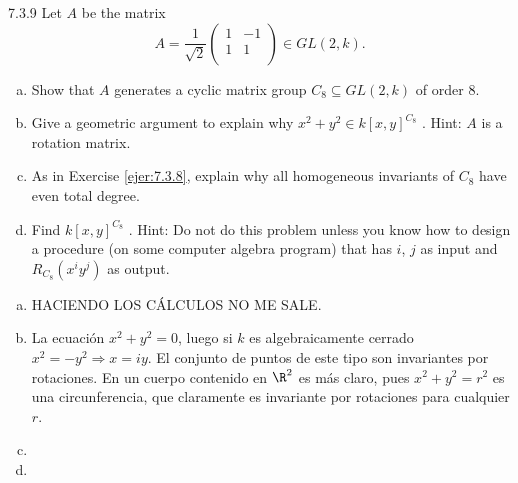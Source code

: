 \documentclass[twoside]{article}
\begin{document}
\begin{ejercicio}{7.3.9}
Let $A$ be the matrix
\[
A =
\frac{1}{\sqrt{2}}\begin{pmatrix}
1 &−1\\
1 &1\\
\end{pmatrix}
∈ GL(2, k).
\]
\begin{enumerate}[a.]
\item Show that $A$ generates a cyclic matrix group $C_8 ⊆ GL(2, k)$ of order 8.
\item Give a geometric argument to explain why $x^2 + y^2 ∈ k[x, y]^{C_8}$ . Hint: $A$ is a rotation
matrix.
\item As in Exercise \ref{ejer:7.3.8}, explain why all homogeneous invariants of $C_8$ have even total
degree.
\item Find $k[x, y]^{C_8}$ . Hint: Do not do this problem unless you know how to design a procedure
(on some computer algebra program) that has $i$, $j$ as input and $R_{C_8} (x^iy^j)$ as
output.
\end{enumerate}
\end{ejercicio}
\begin{solucion}
\begin{enumerate}[a.]
\item HACIENDO LOS CÁLCULOS NO ME SALE.
\item La ecuación $x^2+y^2=0$, luego si $k$ es algebraicamente cerrado $x^2=-y^2\Rightarrow x=iy$. El conjunto de puntos de este tipo son invariantes por rotaciones. En un cuerpo contenido en $\R^2$ es más claro, pues $x^2+y^2=r^2$ es una circunferencia, que claramente es invariante por rotaciones para cualquier $r$.
\item
\item 
\end{enumerate}
\end{solucion}
\newpage
\end{document}
